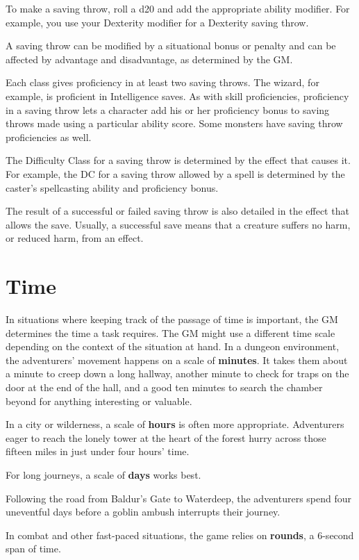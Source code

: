 To make a saving throw, roll a d20 and add the appropriate ability modifier. For example, you use your Dexterity modifier for a Dexterity saving throw.

A saving throw can be modified by a situational bonus or penalty and can be affected by advantage and disadvantage, as determined by the GM.

Each class gives proficiency in at least two saving throws. The wizard, for example, is proficient in Intelligence saves. As with skill proficiencies, proficiency in a saving throw lets a character add his or her proficiency bonus to saving throws made using a particular ability score. Some monsters have saving throw proficiencies as well.

The Difficulty Class for a saving throw is determined by the effect that causes it. For example, the DC for a saving throw allowed by a spell is determined by the caster's spellcasting ability and proficiency bonus.

The result of a successful or failed saving throw is also detailed in the effect that allows the save. Usually, a successful save means that a creature suffers no harm, or reduced harm, from an effect.

\section{Time}

In situations where keeping track of the passage of time is important, the GM determines the time a task requires. The GM might use a different time scale depending on the context of the situation at hand. In a dungeon environment, the adventurers' movement happens on a scale of \textbf{minutes}. It takes them about a minute to creep down a long hallway, another minute to check for traps on the door at the end of the hall, and a good ten minutes to search the chamber beyond for anything interesting or valuable.

In a city or wilderness, a scale of \textbf{hours} is often more appropriate. Adventurers eager to reach the lonely tower at the heart of the forest hurry across those fifteen miles in just under four hours' time.

For long journeys, a scale of \textbf{days} works best.

Following the road from Baldur's Gate to Waterdeep, the adventurers spend four uneventful days before a goblin ambush interrupts their journey.

In combat and other fast-paced situations, the game relies on \textbf{rounds}, a 6-second span of time.

